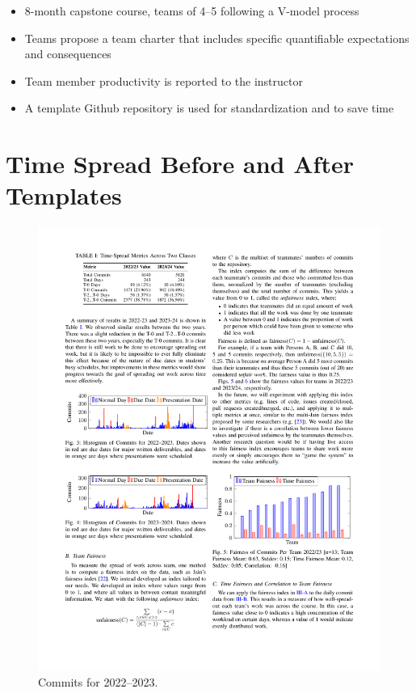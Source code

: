 \documentclass[poster, a0, plainboxedsections]{sciposter}
\begin{document}
\begin{multicols}{2}
\begin{itemize}
\item 8-month capstone course, teams of 4--5 following a V-model process
\item Teams propose a team charter that includes specific quantifiable expectations and
consequences
\item Team member productivity is reported to the instructor
\item A template Github repository is used for standardization and to save time
\end{itemize}


\section{Time Spread Before and After Templates}

\begin{figure}[h!]
\centering
\includegraphics[width=0.9\linewidth]{../figures/HistCommits2022-23.pdf}
\caption{Commits for 2022--2023.}\label{Fig_22_23Timeline}
\end{figure}


\end{multicols}
\end{document}
